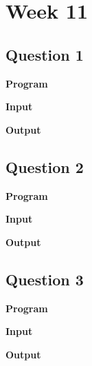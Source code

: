 \documentclass{article}
\begin{document}
\section{Week 11}

\subsection{Question 1}

\newline

\noindent \textbf{\large{Program}}

\newpage
\noindent \textbf{\large{Input}}

\noindent \textbf{\large{Output}}


\newpage
\subsection{Question 2}

\newline

\noindent \textbf{\large{Program}}

\newpage
\noindent \textbf{\large{Input}}

\noindent \textbf{\large{Output}}


\newpage
\subsection{Question 3}

\newline

\noindent \textbf{\large{Program}}

\newpage
\noindent \textbf{\large{Input}}

\noindent \textbf{\large{Output}}

\end{document}
